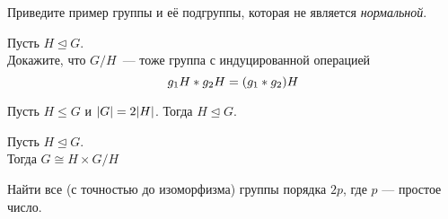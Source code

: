 \documentclass{article}
\begin{document}
    \begin{task_boxed}
        Приведите пример группы и её подгруппы, которая не является \textit{нормальной}.
    \end{task_boxed}

    \begin{task_boxed}
        Пусть $H \trianglelefteq G$.\\
        Докажите, что $G/H$~--- тоже группа с индуцированной операцией
        \[g_{1}H \ast g_{2}H = \lr*{g_{1} \ast g_{2}}H\]
    \end{task_boxed}

    \begin{task_boxed}
        Пусть $H \leq G$ и $\abs*{G} = 2\abs*{H}$.
        Тогда $H \trianglelefteq G$.\\
    \end{task_boxed}

    \begin{task_boxed}
        Пусть $H \trianglelefteq G$.\\
        Тогда $G \cong H \times G/H$
    \end{task_boxed}

    \begin{task_boxed}[ *]
        Найти все (с точностью до изоморфизма) группы порядка $2p$, где $p$ — простое число.
    \end{task_boxed}
\end{document}

